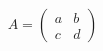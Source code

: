 \documentclass[preview]{standalone}
\begin{document}
\begin{align*}
A = \begin{pmatrix} a & b \\ c & d \end{pmatrix}
\end{align*}
\end{document}
